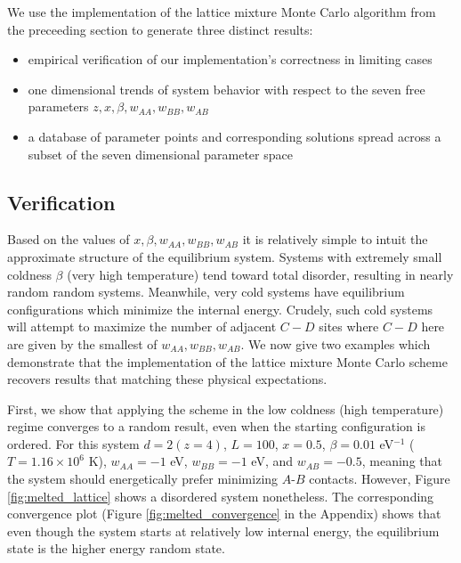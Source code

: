 \documentclass[10pt]{article}
\begin{document}
We use the implementation of the lattice mixture Monte Carlo algorithm from the preceeding section to generate three distinct results:
\begin{itemize}
    \item empirical verification of our implementation's correctness in limiting cases
    \item one dimensional trends of system behavior with respect to the seven free parameters $z,x,\beta,w_{AA},w_{BB},w_{AB}$
    \item a database of parameter points and corresponding solutions spread across a subset of the seven dimensional parameter space
\end{itemize}

\subsection{Verification}
Based on the values of $x,\beta,w_{AA},w_{BB},w_{AB}$ it is relatively simple to intuit the approximate structure of the equilibrium system.
Systems with extremely small coldness $\beta$ (very high temperature) tend toward total disorder, resulting in nearly random random systems.
Meanwhile, very cold systems have equilibrium configurations which minimize the internal energy.
Crudely, such cold systems will attempt to maximize the number of adjacent $C-D$ sites where $C-D$ here are given by the smallest of $w_{AA},w_{BB},w_{AB}$.
We now give two examples which demonstrate that the implementation of the lattice mixture Monte Carlo scheme recovers results that matching these physical expectations.

First, we show that applying the scheme in the low coldness (high temperature) regime converges to a random result, even when the starting configuration is ordered.
For this system $d=2 (z=4)$, $L=100$, $x=0.5$, $\beta = 0.01$ eV$^{-1}$ ($T=1.16 \times 10^6$ K), $w_{AA}=-1$ eV, $w_{BB} = -1$ eV, and $w_{AB} = -0.5$, meaning that the system should energetically prefer minimizing $A$-$B$ contacts.
However, Figure \ref{fig:melted_lattice} shows a disordered system nonetheless.
The corresponding convergence plot (Figure \ref{fig:melted_convergence} in the Appendix) shows that even though the system starts at relatively low internal energy, the equilibrium state is the higher energy random state.
\end{document}
